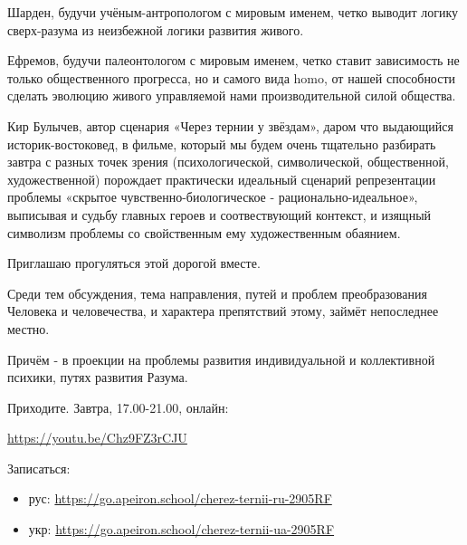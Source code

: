 Шарден, будучи учёным-антропологом с мировым именем, четко выводит логику
сверх-разума из неизбежной логики развития живого.

Ефремов, будучи палеонтологом с мировым именем, четко ставит зависимость не
только общественного прогресса, но и самого вида homo, от нашей способности
сделать эволюцию живого управляемой нами производительной силой общества. 

Кир Булычев, автор сценария «Через тернии у звёздам», даром что выдающийся
историк-востоковед, в фильме, который мы будем очень тщательно разбирать завтра
с разных точек зрения (психологической, символической, общественной,
художественной) порождает практически идеальный сценарий репрезентации проблемы
«скрытое чувственно-биологическое - рационально-идеальное», выписывая и судьбу
главных героев и соотвествующий контекст, и изящный символизм проблемы со
свойственным ему художественным обаянием.

Приглашаю прогуляться этой дорогой вместе.

Среди тем обсуждения, тема направления, путей и проблем преобразования Человека
и человечества, и характера препятствий этому, займёт непоследнее местно. 

Причём - в проекции на проблемы развития индивидуальной и коллективной психики,
путях развития Разума. 

Приходите. Завтра, 17.00-21.00, онлайн:

\url{https://youtu.be/Chz9FZ3rCJU}

Записаться:

\begin{itemize}
\item рус: \url{https://go.apeiron.school/cherez-ternii-ru-2905RF}
\item укр: \url{https://go.apeiron.school/cherez-ternii-ua-2905RF}
\end{itemize}
